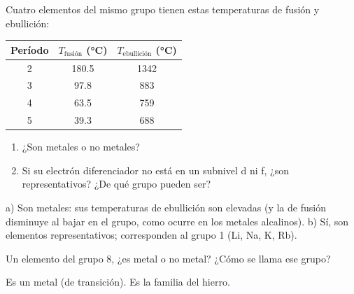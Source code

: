 \begin{exercise}
    Cuatro elementos del mismo grupo tienen estas temperaturas de fusión y ebullición:
    \begin{center}
        \begin{tabular}{@{}ccc@{}}
            \toprule
            \textbf{Período} & \textbf{\(T_\text{fusión}\) (\unit{\celsius})} & \textbf{\(T_\text{ebullición}\) (\unit{\celsius})} \\
            \midrule
            2 & \num{180.5} & \num{1342} \\[3pt]
            3 & \num{97.8} & \num{883} \\[3pt]
            4 & \num{63.5} & \num{759} \\[3pt]
            5 & \num{39.3} & \num{688} \\
            \bottomrule
        \end{tabular}
    \end{center}
    \begin{enumerate}[label=\alph*)]
        \item ¿Son metales o no metales?
        \item Si su electrón diferenciador no está en un subnivel d ni f, ¿son representativos? ¿De qué grupo pueden ser?
    \end{enumerate}
    \begin{solu}
        a) Son metales: sus temperaturas de ebullición son elevadas (y la de fusión disminuye al bajar en el grupo, como ocurre en los metales alcalinos). b) Sí, son elementos representativos; corresponden al grupo 1 (Li, Na, K, Rb).
    \end{solu}
\end{exercise}

\begin{exercise}
    Un elemento del grupo 8, ¿es metal o no metal? ¿Cómo se llama ese grupo?
    \begin{solu}
        Es un metal (de transición). Es la familia del hierro.
    \end{solu}
\end{exercise}

